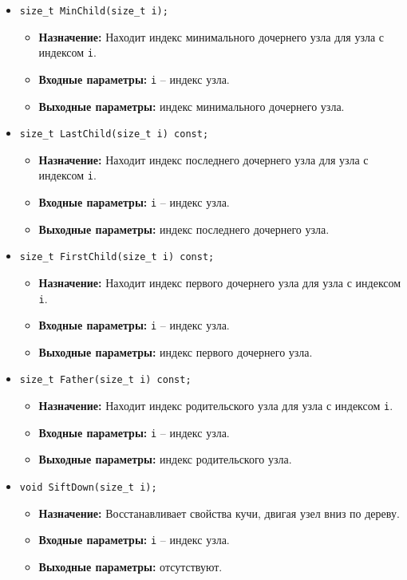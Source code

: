 \begin{itemize}
    \item \texttt{size\_t MinChild(size\_t i);}
    \begin{itemize}
        \item \textbf{Назначение:} Находит индекс минимального дочернего узла для узла с индексом \texttt{i}.
        \item \textbf{Входные параметры:} \texttt{i} -- индекс узла.
        \item \textbf{Выходные параметры:} индекс минимального дочернего узла.
    \end{itemize}

    \item \texttt{size\_t LastChild(size\_t i) const;}
    \begin{itemize}
        \item \textbf{Назначение:} Находит индекс последнего дочернего узла для узла с индексом \texttt{i}.
        \item \textbf{Входные параметры:} \texttt{i} -- индекс узла.
        \item \textbf{Выходные параметры:} индекс последнего дочернего узла.
    \end{itemize}

    \item \texttt{size\_t FirstChild(size\_t i) const;}
    \begin{itemize}
        \item \textbf{Назначение:} Находит индекс первого дочернего узла для узла с индексом \texttt{i}.
        \item \textbf{Входные параметры:} \texttt{i} -- индекс узла.
        \item \textbf{Выходные параметры:} индекс первого дочернего узла.
    \end{itemize}

    \item \texttt{size\_t Father(size\_t i) const;}
    \begin{itemize}
        \item \textbf{Назначение:} Находит индекс родительского узла для узла с индексом \texttt{i}.
        \item \textbf{Входные параметры:} \texttt{i} -- индекс узла.
        \item \textbf{Выходные параметры:} индекс родительского узла.
    \end{itemize}

    \item \texttt{void SiftDown(size\_t i);}
    \begin{itemize}
        \item \textbf{Назначение:} Восстанавливает свойства кучи, двигая узел вниз по дереву.
        \item \textbf{Входные параметры:} \texttt{i} -- индекс узла.
        \item \textbf{Выходные параметры:} отсутствуют.
    \end{itemize}


\end{itemize}
